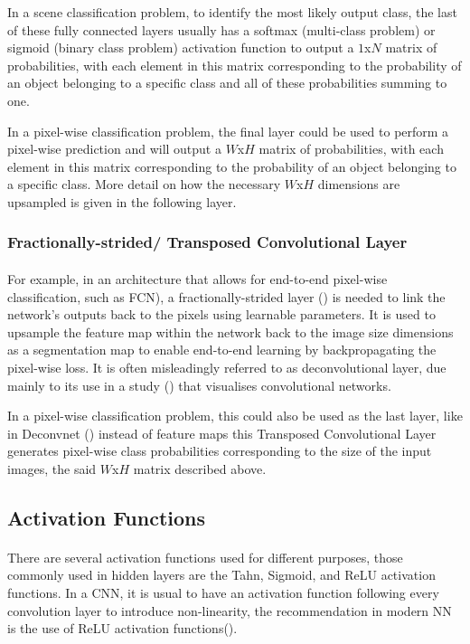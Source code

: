 In a scene classification problem, to identify the most likely output class, the last of these fully connected layers usually has a softmax (multi-class problem)  or sigmoid (binary class problem) activation function to output a $1$x$N$ matrix of probabilities, with each element in this matrix corresponding to the probability of an object belonging to a specific class and all of these probabilities summing to one.

In a pixel-wise classification problem, the final layer could be used to perform a pixel-wise prediction and will output a $W$x$H$ matrix of probabilities, with each element in this matrix corresponding to the probability of an object belonging to a specific class. More detail on how the necessary $W$x$H$ dimensions are upsampled is given in the following layer.

\subsubsection{Fractionally-strided/ Transposed Convolutional Layer}
\paragraph{}
For example, in an architecture that allows for end-to-end pixel-wise classification, such as \gls{FCN}), a fractionally-strided layer (\cite{long2015fully}) is needed to link the network's outputs back to the pixels  using learnable parameters. It is used to upsample the feature map within the network back to the image size dimensions as a segmentation map to enable end-to-end learning by backpropagating the pixel-wise loss. It is often misleadingly  referred to as deconvolutional layer, due mainly to its use in a study (\cite{zeiler2013visualizing}) that visualises convolutional networks. 

In a pixel-wise classification problem, this could also be used as the last layer, like in Deconvnet (\cite{7410535}) instead of feature maps this Transposed Convolutional Layer generates pixel-wise class probabilities corresponding to the size of the input images, the said $W$x$H$ matrix described above.

\subsection{Activation Functions} \label{cnn_activation}
\paragraph{}
There are several activation functions used for different purposes, those commonly used in hidden layers are the Tahn, Sigmoid, and \gls{ReLU} activation functions.
In a \gls{CNN}, it is usual to have an activation function following every convolution layer to introduce non-linearity, the recommendation in modern \gls{NN} is the use of \gls{ReLU} activation functions(\cite{GoodBengCour16}).

